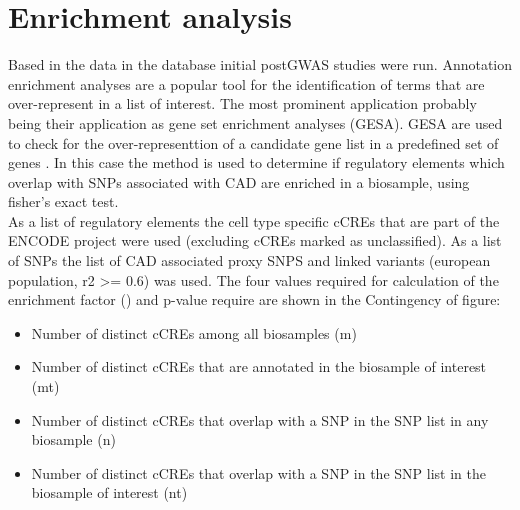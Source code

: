 \section{Enrichment analysis}
\label{sec:enrichment}
Based in the data in the database initial postGWAS studies were run. Annotation enrichment analyses are a popular tool for the identification of terms that are over-represent in a list of interest. The most prominent application probably being their application as gene set enrichment analyses (GESA). GESA are used to check for the over-representtion of a candidate gene list in a predefined set of genes \cite{tipneyIntroductionEffectiveUse2010}. In this case the method is used to determine if regulatory elements which overlap with SNPs associated with CAD are enriched in a biosample, using fisher's exact test.\\
As a list of regulatory elements the cell type specific cCREs that are part of the ENCODE project were used (excluding cCREs marked as unclassified). As a list of SNPs the list of CAD associated proxy SNPS and linked variants (european population, r2 >= 0.6) was used. The four values required for calculation of the enrichment factor () and p-value require are shown in the Contingency of figure:

\begin{itemize}
    \item Number of distinct cCREs among all biosamples (m)
    \item Number of distinct cCREs that are annotated in the biosample of interest (mt)
    \item Number of distinct cCREs that overlap with a SNP in the SNP list in any biosample (n)
    \item Number of distinct cCREs that overlap with a SNP in the SNP list in the biosample of interest (nt)
\end{itemize}

